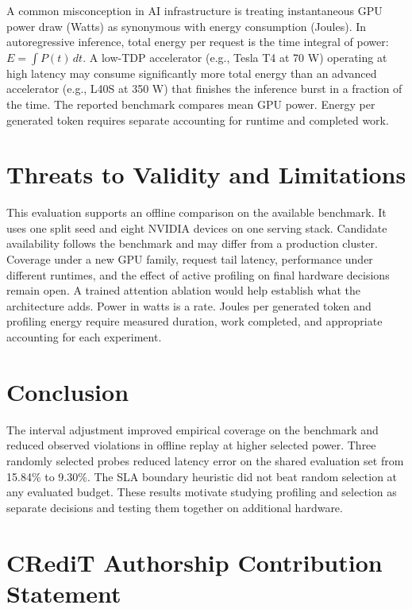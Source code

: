 \documentclass[preprint,12pt]{elsarticle}
\begin{document}
A common misconception in AI infrastructure is treating instantaneous
GPU power draw (Watts) as synonymous with energy consumption (Joules).
In autoregressive inference, total energy per request is the time
integral of power: $E = \int P(t)\,dt$. A low-TDP accelerator (e.g., Tesla T4
at 70 W) operating at high latency may consume significantly more total
energy than an advanced accelerator (e.g., L40S at 350 W) that finishes
the inference burst in a fraction of the time. The reported benchmark
compares mean GPU power. Energy per generated token requires separate
accounting for runtime and completed work.

\section{Threats to Validity and
Limitations}\label{threats-to-validity-and-limitations}

This evaluation supports an offline comparison on the available
benchmark. It uses one split seed and eight NVIDIA devices on one
serving stack. Candidate availability follows the benchmark and may
differ from a production cluster. Coverage under a new GPU family,
request tail latency, performance under different runtimes, and the
effect of active profiling on final hardware decisions remain open. A
trained attention ablation would help establish what the architecture
adds. Power in watts is a rate. Joules per generated token and profiling
energy require measured duration, work completed, and appropriate
accounting for each experiment.

\section{Conclusion}\label{conclusion}

The interval adjustment improved empirical coverage on the benchmark and
reduced observed violations in offline replay at higher selected power.
Three randomly selected probes reduced latency error on the shared
evaluation set from 15.84\% to 9.30\%. The SLA boundary heuristic did
not beat random selection at any evaluated budget. These results
motivate studying profiling and selection as separate decisions and
testing them together on additional hardware.

\section*{CRediT Authorship Contribution
Statement}\label{credit-authorship-contribution-statement}
\end{document}
